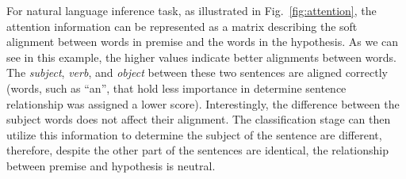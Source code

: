 For natural language inference task, as illustrated in Fig.~\ref{fig:attention}, the attention information can be represented as a matrix describing the soft alignment between words in premise and the words in the hypothesis. As we can see in this example, the higher values indicate better alignments between words. The \emph{subject}, \emph{verb}, and \emph{object} between these two sentences are aligned correctly (words, such as ``an'', that hold less importance in determine sentence relationship was assigned a lower score). Interestingly, the difference between the subject words does not affect their alignment. The classification stage can then utilize this information to determine the subject of the sentence are different, therefore, despite the other part of the sentences are identical, the relationship between premise and hypothesis is neutral.

